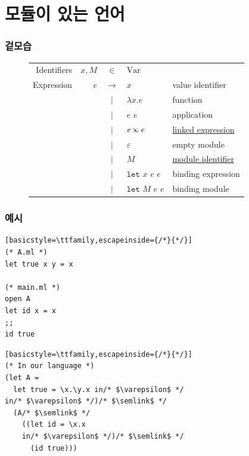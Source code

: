 \documentclass{beamer}
\newcommand*{\vbar}{|}
\newcommand*{\ExprVar}{\text{Var}}
\newcommand*{\semlink}{\mathbin{\rotatebox[origin=c]{180}{$\propto$}}}
\newcommand*{\link}[2]{{#1}\semlink{#2}}
\newcommand*{\Let}{\mathtt{let}}
\begin{document}
\section{모듈이 있는 언어}
\begin{frame}[c]
  \frametitle{겉모습}
  \begin{figure}[h!]
    \centering
    \begin{tabular}{rrcll}
      Identifiers & $x,M$ & $\in$         & $\ExprVar$                                         \\
      Expression  & $e$   & $\rightarrow$ & $x$                & value identifier              \\
                  &       & $\vbar$       & $\lambda x.e$      & function                      \\
                  &       & $\vbar$       & $e$ $e$            & application                   \\
                  &       & $\vbar$       & $\link{e}{e}$      & \underline{linked expression} \\
                  &       & $\vbar$       & $\varepsilon$      & empty module                  \\
                  &       & $\vbar$       & $M$                & \underline{module identifier} \\
                  &       & $\vbar$       & $\Let$ $x$ $e$ $e$ & binding expression            \\
                  &       & $\vbar$       & $\Let$ $M$ $e$ $e$ & binding module                \\
    \end{tabular}
  \end{figure}
\end{frame}
\begin{frame}[c,fragile]
  \frametitle{예시}
  \begin{tcolorbox}[sidebyside, sidebyside align=top, fontupper=\scriptsize, fontlower=\scriptsize]
    \begin{lstlisting}[basicstyle=\ttfamily,escapeinside={/*}{*/}]
(* A.ml *)
let true x y = x

(* main.ml *)
open A
let id x = x
;;
id true
\end{lstlisting}
    \tcblower
    \begin{lstlisting}[basicstyle=\ttfamily,escapeinside={/*}{*/}]
(* In our language *)
(let A =
  let true = \x.\y.x in/* $\varepsilon$ */
in/* $\varepsilon$ */)/* $\semlink$ */
  (A/* $\semlink$ */
    ((let id = \x.x
    in/* $\varepsilon$ */)/* $\semlink$ */
      (id true)))
\end{lstlisting}
  \end{tcolorbox}
\end{frame}
\end{document}
